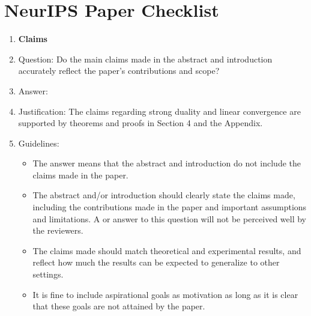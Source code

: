 \section*{NeurIPS Paper Checklist}

\begin{enumerate}

\item {\bf Claims}
    \item[] Question: Do the main claims made in the abstract and introduction accurately reflect the paper's contributions and scope?
    \item[] Answer: \answerYes{}
    \item[] Justification: The claims regarding strong duality and linear convergence are supported by theorems and proofs in Section 4 and the Appendix.
    \item[] Guidelines:
    \begin{itemize}
        \item The answer \answerNA{} means that the abstract and introduction do not include the claims made in the paper.
        \item The abstract and/or introduction should clearly state the claims made, including the contributions made in the paper and important assumptions and limitations. A \answerNo{} or \answerNA{} answer to this question will not be perceived well by the reviewers. 
        \item The claims made should match theoretical and experimental results, and reflect how much the results can be expected to generalize to other settings. 
        \item It is fine to include aspirational goals as motivation as long as it is clear that these goals are not attained by the paper. 
    \end{itemize}


\end{enumerate}
